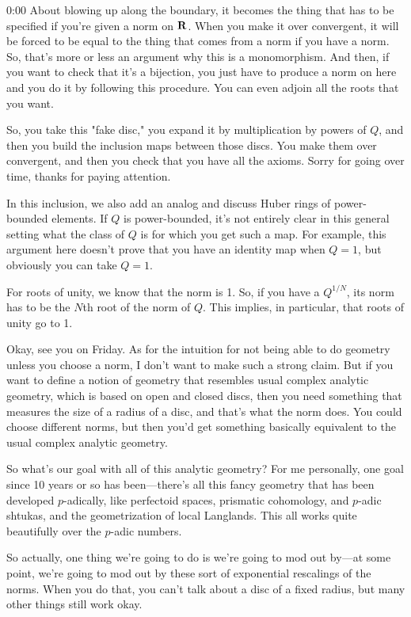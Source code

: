 \begin{unfinished}{0:00}
About blowing up along the boundary, it becomes the thing that has to be specified if you're given a norm on $\mathbf R$. When you make it over convergent, it will be forced to be equal to the thing that comes from a norm if you have a norm. So, that's more or less an argument why this is a monomorphism. And then, if you want to check that it's a bijection, you just have to produce a norm on here and you do it by following this procedure. You can even adjoin all the roots that you want.

So, you take this "fake disc," you expand it by multiplication by powers of $Q$, and then you build the inclusion maps between those discs. You make them over convergent, and then you check that you have all the axioms. Sorry for going over time, thanks for paying attention.

In this inclusion, we also add an analog and discuss Huber rings of power-bounded elements. If $Q$ is power-bounded, it's not entirely clear in this general setting what the class of $Q$ is for which you get such a map. For example, this argument here doesn't prove that you have an identity map when $Q = 1$, but obviously you can take $Q = 1$.

For roots of unity, we know that the norm is 1. So, if you have a $Q^{1/N}$, its norm has to be the $N$th root of the norm of $Q$. This implies, in particular, that roots of unity go to 1.

Okay, see you on Friday. As for the intuition for not being able to do geometry unless you choose a norm, I don't want to make such a strong claim. But if you want to define a notion of geometry that resembles usual complex analytic geometry, which is based on open and closed discs, then you need something that measures the size of a radius of a disc, and that's what the norm does. You could choose different norms, but then you'd get something basically equivalent to the usual complex analytic geometry.

So what's our goal with all of this analytic geometry? For me personally, one goal since 10 years or so has been---there's all this fancy geometry that has been developed $p$-adically, like perfectoid spaces, prismatic cohomology, and $p$-adic shtukas, and the geometrization of local Langlands. This all works quite beautifully over the $p$-adic numbers.


So actually, one thing we're going to do is we're going to mod out by---at some point, we're going to mod out by these sort of exponential rescalings of the norms. When you do that, you can't talk about a disc of a fixed radius, but many other things still work okay. 


\end{unfinished}
